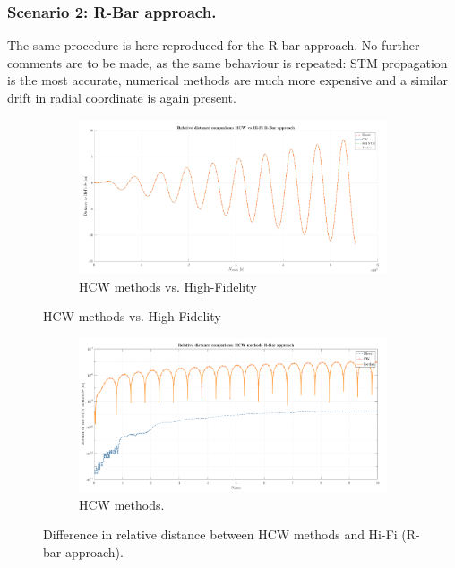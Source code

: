		\subsubsection{Scenario 2: R-Bar approach. }
		\indent The same procedure is here reproduced for the R-bar approach. No further comments are to be made, as the same behaviour is repeated: STM propagation is the most accurate, numerical methods are much more expensive and a similar drift in radial coordinate is again present.
		\begin{figure}[!htb]
		\centering
		\begin{subfigure}[t]{\linewidth}
		\begin{changemargin}{-1.3cm}{-1cm}
		\begin{adjustbox}{width=1.1\textwidth}
		\centering\includegraphics[width = \linewidth]{Chapters/Chapter_02/dr_comp_R_bar_approach}
		\end{adjustbox}
		\end{changemargin}
		\caption{HCW methods vs. High-Fidelity}
		\label{figCh2:dr_comp_HiFi_R_bar_approach}
		\end{subfigure}
		\end{figure}
		\begin{figure}[!htb]
		\ContinuedFloat
		\centering
		\begin{subfigure}[t]{\linewidth}
		\begin{changemargin}{-1.3cm}{-1cm}
		\begin{adjustbox}{width=1.1\textwidth}
		\centering\includegraphics[width = \linewidth]{Chapters/Chapter_02/dr_comp_HCW_R_bar_approach}
		\end{adjustbox}
		\end{changemargin}
		\caption{HCW methods.}
		\label{figCh2:dr_comp_HCW_R_bar_approach}
		\end{subfigure}
		\caption{Difference in relative distance between HCW methods and Hi-Fi (R-bar approach).}
		\end{figure}
